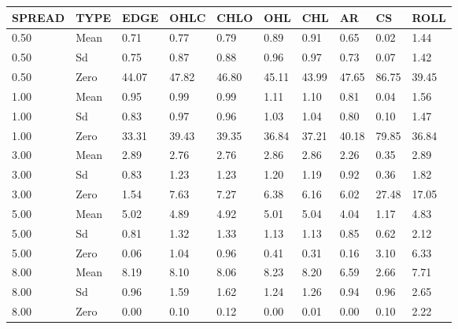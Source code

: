 \begin{table}[ht]
\centering
\begin{tabular}{llllllllll}
  \hline
SPREAD & TYPE & EDGE & OHLC & CHLO & OHL & CHL & AR & CS & ROLL \\ 
  \hline
0.50 & Mean & 0.71 & 0.77 & 0.79 & 0.89 & 0.91 & 0.65 & 0.02 & 1.44 \\ 
  0.50 & Sd & 0.75 & 0.87 & 0.88 & 0.96 & 0.97 & 0.73 & 0.07 & 1.42 \\ 
  0.50 & Zero & 44.07 & 47.82 & 46.80 & 45.11 & 43.99 & 47.65 & 86.75 & 39.45 \\ 
  1.00 & Mean & 0.95 & 0.99 & 0.99 & 1.11 & 1.10 & 0.81 & 0.04 & 1.56 \\ 
  1.00 & Sd & 0.83 & 0.97 & 0.96 & 1.03 & 1.04 & 0.80 & 0.10 & 1.47 \\ 
  1.00 & Zero & 33.31 & 39.43 & 39.35 & 36.84 & 37.21 & 40.18 & 79.85 & 36.84 \\ 
  3.00 & Mean & 2.89 & 2.76 & 2.76 & 2.86 & 2.86 & 2.26 & 0.35 & 2.89 \\ 
  3.00 & Sd & 0.83 & 1.23 & 1.23 & 1.20 & 1.19 & 0.92 & 0.36 & 1.82 \\ 
  3.00 & Zero & 1.54 & 7.63 & 7.27 & 6.38 & 6.16 & 6.02 & 27.48 & 17.05 \\ 
  5.00 & Mean & 5.02 & 4.89 & 4.92 & 5.01 & 5.04 & 4.04 & 1.17 & 4.83 \\ 
  5.00 & Sd & 0.81 & 1.32 & 1.33 & 1.13 & 1.13 & 0.85 & 0.62 & 2.12 \\ 
  5.00 & Zero & 0.06 & 1.04 & 0.96 & 0.41 & 0.31 & 0.16 & 3.10 & 6.33 \\ 
  8.00 & Mean & 8.19 & 8.10 & 8.06 & 8.23 & 8.20 & 6.59 & 2.66 & 7.71 \\ 
  8.00 & Sd & 0.96 & 1.59 & 1.62 & 1.24 & 1.26 & 0.94 & 0.96 & 2.65 \\ 
  8.00 & Zero & 0.00 & 0.10 & 0.12 & 0.00 & 0.01 & 0.00 & 0.10 & 2.22 \\ 
   \hline
\end{tabular}
\end{table}
